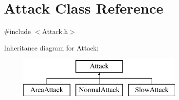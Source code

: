 \hypertarget{class_attack}{\section{Attack Class Reference}
\label{class_attack}
}


{\ttfamily \#include $<$Attack.\+h$>$}

Inheritance diagram for Attack\+:\begin{figure}[H]
\begin{center}
\leavevmode
\includegraphics[height=2.000000cm]{class_attack}
\end{center}
\end{figure}
